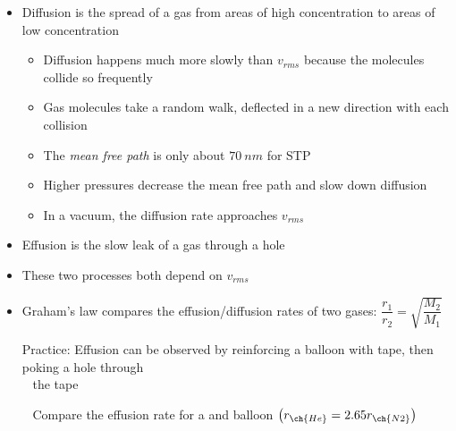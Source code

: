 \documentclass[12pt, openany, letterpaper]{memoir}
\begin{document}
\begin{itemize}
        ~\hphantom{Practice: } $-20~^\circ C$($474.8~\nicefrac{m}{s}$, $207.9~\nicefrac{m}{s}$, $1256~\nicefrac{m}{s}$)\hspace{1em} $150~^\circ C$($613.8~\nicefrac{m}{s}$, $269.4~\nicefrac{m}{s}$, $1624~\nicefrac{m}{s}$)
  \item Diffusion is the spread of a gas from areas of high concentration to areas of low concentration
    \begin{itemize}
      \item Diffusion happens much more slowly than $v_{rms}$ because the molecules collide so frequently
      \item Gas molecules take a random walk, deflected in a new direction with each collision
      \item The \emph{mean free path} is only about $70~nm$ for STP
      \item Higher pressures decrease the mean free path and slow down diffusion
      \item In a vacuum, the diffusion rate approaches $v_{rms}$
    \end{itemize}
  \item Effusion is the slow leak of a gas through a hole
  \item These two processes both depend on $v_{rms}$
  \item Graham's law compares the effusion/diffusion rates of two gases: $\dfrac{r_1}{r_2}=\sqrt{\dfrac{M_2}{M_1}}$

        Practice: Effusion can be observed by reinforcing a balloon with tape, then poking a hole through\\
        ~\hphantom{Practice: } the tape

        ~\hphantom{Practice: } Compare the effusion rate for a  and  balloon $\left(r_{\ch{He}}=2.65r_{\ch{N2}}\right)$
\end{itemize}
\end{document}
